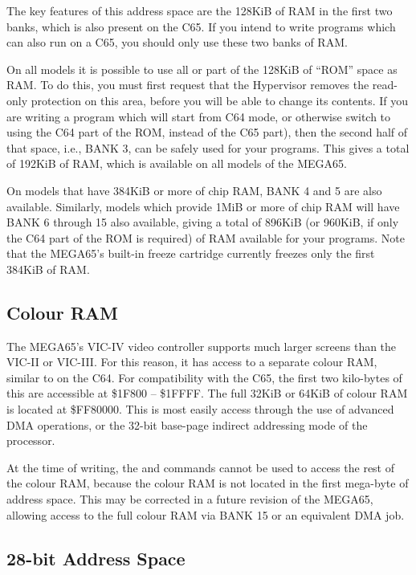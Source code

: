 The key features of this address space are the 128KiB of RAM in the first two banks, which is also present on
the C65. If you intend to write programs which can also run on a C65, you should only use these two banks
of RAM.

On all models it is possible to use all or part of the 128KiB of ``ROM'' space as RAM. To do this, you must first
request that the Hypervisor removes the read-only protection on this area, before you will be able to change
its contents.  If you are writing a program which will start from C64 mode, or otherwise switch to using the C64
part of the ROM, instead of the C65 part), then the second half of that space, i.e., BANK 3, can be safely used
for your programs. This gives a total of 192KiB of RAM, which is available on all models of the MEGA65.

On models that have 384KiB or more of chip RAM, BANK 4 and 5 are also available.  Similarly, models which provide
1MiB or more of chip RAM will have BANK 6 through 15 also available, giving a total of 896KiB (or 960KiB, if only
the C64 part of the ROM is required) of RAM available for your programs.  Note that the MEGA65's built-in
freeze cartridge currently freezes only the first 384KiB of RAM.

\subsection{Colour RAM}

The MEGA65's VIC-IV video controller supports much larger screens than the VIC-II or VIC-III. For this reason, it
has access to a separate colour RAM, similar to on the C64.  For compatibility with the C65, the first two kilo-bytes
of this are accessible at \$1F800 -- \$1FFFF.  The full 32KiB or 64KiB of colour RAM is located at \$FF80000.
This is most easily access through the use of advanced DMA operations, or the 32-bit base-page indirect addressing
mode of the processor.

At the time of writing, the  and  commands cannot be used to access the rest of the colour RAM, because the
colour RAM is not located in the first mega-byte of address space.  This may be corrected in a future revision of
the MEGA65, allowing access to the full colour RAM via BANK 15 or an equivalent DMA job.

\subsection{28-bit Address Space}

